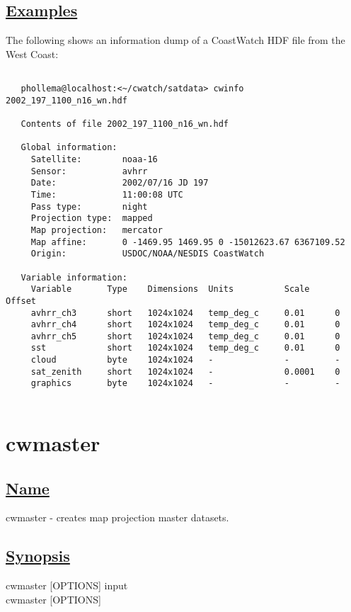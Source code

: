 \subsection*{\underline{Examples}}


  The following shows an information dump of a CoastWatch HDF file from the West Coast: \begin{verbatim}

   phollema@localhost:<~/cwatch/satdata> cwinfo 2002_197_1100_n16_wn.hdf

   Contents of file 2002_197_1100_n16_wn.hdf
   
   Global information:
     Satellite:        noaa-16
     Sensor:           avhrr
     Date:             2002/07/16 JD 197
     Time:             11:00:08 UTC
     Pass type:        night
     Projection type:  mapped
     Map projection:   mercator
     Map affine:       0 -1469.95 1469.95 0 -15012623.67 6367109.52 
     Origin:           USDOC/NOAA/NESDIS CoastWatch
   
   Variable information:
     Variable       Type    Dimensions  Units          Scale     Offset    
     avhrr_ch3      short   1024x1024   temp_deg_c     0.01      0         
     avhrr_ch4      short   1024x1024   temp_deg_c     0.01      0         
     avhrr_ch5      short   1024x1024   temp_deg_c     0.01      0         
     sst            short   1024x1024   temp_deg_c     0.01      0         
     cloud          byte    1024x1024   -              -         -         
     sat_zenith     short   1024x1024   -              0.0001    0         
     graphics       byte    1024x1024   -              -         -         
 
\end{verbatim}


\newpage
\section{cwmaster} \hypertarget{cwmaster}{}
\subsection*{\underline{Name}}


   cwmaster - creates map projection master datasets.  
\subsection*{\underline{Synopsis}}


  cwmaster [OPTIONS] input \\ 
 cwmaster [OPTIONS] 

